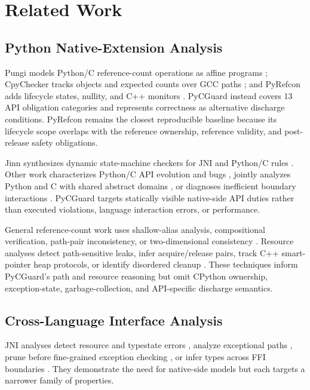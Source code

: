 \section{Related Work}
\label{sec:related}

\subsection{Python Native-Extension Analysis}

Pungi models Python/C reference-count operations as affine programs
\cite{pungi2014}; CpyChecker tracks objects and expected counts over GCC paths
\cite{cpychecker}; and PyRefcon adds lifecycle states, nullity, and C++ monitors
\cite{pyrefcon2023}. PyCGuard instead covers 13 API obligation categories and
represents correctness as alternative discharge conditions. PyRefcon remains
the closest reproducible baseline because its lifecycle scope overlaps
with the reference ownership, reference validity, and post-release
safety obligations.

Jinn synthesizes dynamic state-machine checkers for JNI and Python/C rules
\cite{jinn2010}. Other work characterizes Python/C API evolution and bugs
\cite{hu2020pythoncapi}, jointly analyzes Python and C with shared abstract
domains \cite{monat2021multilanguage}, or diagnoses inefficient boundary
interactions \cite{pieprof2021}. PyCGuard targets statically visible native-side
API duties rather than executed violations, language interaction errors, or
performance.

General reference-count work uses shallow-alias analysis, compositional
verification, path-pair inconsistency, or two-dimensional consistency
\cite{lal2010refcount,referee2009,rid2016,cid2021}. Resource analyses detect
path-sensitive leaks, infer acquire/release pairs, track C++ smart-pointer heap
protocols, or identify disordered cleanup
\cite{smoke2019,sinkfinder2020,smartpointer2021,hero2021}. These techniques
inform PyCGuard's path and resource reasoning but omit CPython ownership,
exception-state, garbage-collection, and API-specific discharge semantics.

\subsection{Cross-Language Interface Analysis}

JNI analyses detect resource and typestate errors \cite{kondoh2008jni}, analyze
exceptional paths \cite{li2009jni,li2014jniexception}, prune before fine-grained
exception checking \cite{jet2011}, or infer types across FFI boundaries
\cite{furr2008ffi}. They demonstrate the need for native-side models but each
targets a narrower family of properties.

